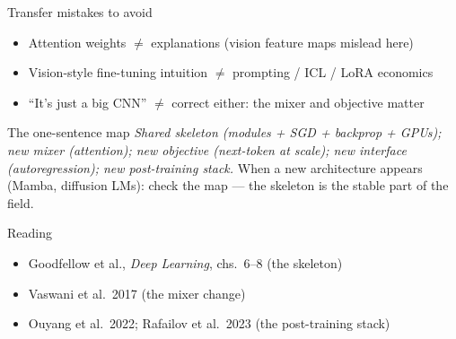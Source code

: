 \documentclass[aspectratio=169,11pt]{beamer}
\begin{document}
\begin{frame}{Transfer mistakes to avoid}
\begin{itemize}
\item Attention weights $\neq$ explanations (vision feature maps mislead here)
\item Vision-style fine-tuning intuition $\neq$ prompting / ICL / LoRA economics
\item ``It's just a big CNN'' $\neq$ correct either: the mixer and objective matter
\end{itemize}
\end{frame}

\begin{frame}{The one-sentence map}
\emph{Shared skeleton (modules + SGD + backprop + GPUs); new mixer (attention); new objective (next-token at scale); new interface (autoregression); new post-training stack.}
\vspace{1em}
\pause
When a new architecture appears (Mamba, diffusion LMs): check the map --- the skeleton is the stable part of the field.
\end{frame}

\begin{frame}{Reading}
\begin{itemize}
\item Goodfellow et al., \emph{Deep Learning}, chs.\ 6--8 (the skeleton)
\item Vaswani et al.\ 2017 (the mixer change)
\item Ouyang et al.\ 2022; Rafailov et al.\ 2023 (the post-training stack)
\end{itemize}
\end{frame}
\end{document}
